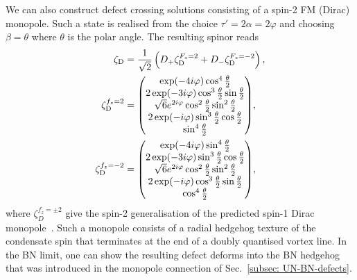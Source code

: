 We can also construct defect crossing solutions consisting of a spin-2 FM
(Dirac) monopole.
Such a state is realised from the choice \(\tau'=2\alpha=2\varphi \) and
choosing \(\beta = \theta \) where \(\theta \) is the polar angle.
The resulting spinor reads
\begin{align}\label{eq: C-FM-Dirac}
    \zeta_\text{D}          & = \frac{1}{\sqrt{2}}
    \left( D_+\zeta^{F_z=2}_\text{D}+ D_-\zeta^{F_z=-2}_\text{D}\right), \\
    \zeta^{f_z=2}_\text{D}  & =
    \mqty(
    \exp(-4i\varphi) \cos^4 \frac{\theta}{2}                             \\
    2\exp(-3i\varphi) \cos^3 \frac{\theta}{2} \sin \frac{\theta}{2}      \\
    \sqrt{6}e^{2i\varphi}\cos^2\frac{\theta}{2}\sin^2\frac{\theta}{2}    \\
    2\exp(-i\varphi) \sin^3 \frac{\theta}{2} \cos \frac{\theta}{2}       \\
    \sin^4\frac{\theta}{2}
    \label{eq: C-BN-dirac2}
    ),                                                                   \\
    \zeta^{f_z=-2}_\text{D} & =
    \mqty(
    \exp(-4i\varphi) \sin^4 \frac{\theta}{2}                             \\
    2\exp(-3i\varphi) \sin^3 \frac{\theta}{2} \cos \frac{\theta}{2}      \\
    \sqrt{6}e^{2i\varphi}\cos^2\frac{\theta}{2}\sin^2\frac{\theta}{2}    \\
    2\exp(-i\varphi) \cos^3 \frac{\theta}{2} \sin \frac{\theta}{2}       \\
    \cos^4\frac{\theta}{2}
    \label{eq: C-BN-dirac-2}
    ),
\end{align}
where \(\zeta_D^{f_z = \pm 2}\) give the spin-2 generalisation of the
predicted spin-1 Dirac monopole~\cite{Savage2003}.
Such a monopole consists of a radial hedgehog texture of the condensate spin
that terminates at the end of a doubly quantised vortex line.
In the BN limit, one can show the resulting defect deforms into the BN hedgehog
that was introduced in the monopole connection of
Sec.~\ref{subsec: UN-BN-defects}.

